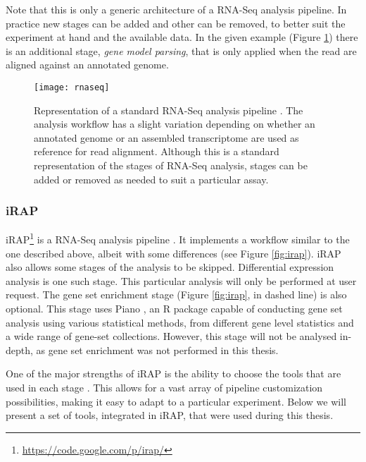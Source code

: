 Note that this is only a generic architecture of a RNA-Seq analysis pipeline. In
practice new stages can be added and other can be removed, to better suit the
experiment at hand and the available data. In the given example (Figure
\ref{fig:rnaseq}) there is an additional stage, \emph{gene model parsing}, that
is only applied when the read are aligned against an annotated genome.

\begin{figure}[!htb]
  \begin{center}
    \leavevmode
    \texttt{[image: rnaseq]}
    \caption[Representation of a standard RNA-Seq analysis pipeline]{
      Representation of a standard RNA-Seq analysis pipeline
      \cite{rnaseqpipeline}. The analysis workflow has a slight variation
      depending on whether an annotated genome or an assembled transcriptome are
      used as reference for read alignment. Although this is a standard
      representation of the stages of RNA-Seq analysis, stages can be added or
      removed as needed to suit a particular assay.
    }
    \label{fig:rnaseq}
  \end{center}
\end{figure}

\subsubsection*{iRAP}\label{sec:irap}

iRAP\footnote{\url{https://code.google.com/p/irap/}} is a RNA-Seq analysis
pipeline \cite{irap}. It implements a workflow similar to the one described
above, albeit with some differences (see Figure \ref{fig:irap}). iRAP also
allows some stages of the analysis to be skipped. Differential expression
analysis is one such stage. This particular analysis will only be performed at
user request. The gene set enrichment stage (Figure \ref{fig:irap}, in dashed
line) is also optional. This stage uses Piano \cite{varemo01042013}, an R
package capable of conducting gene set analysis using various statistical
methods, from different gene level statistics and a wide range of gene-set
collections. However, this stage will not be analysed in-depth, as gene set
enrichment was not performed in this thesis.

One of the major strengths of iRAP is the ability to choose the tools that are
used in each stage \cite{irap}. This allows for a vast array of pipeline customization
possibilities, making it easy to adapt to a particular experiment. Below we will
present a set of tools, integrated in iRAP, that were used during this thesis.

